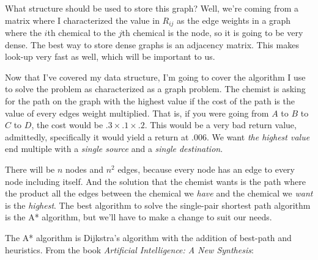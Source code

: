 \documentclass[11pt]{article}
\begin{document}
\begin{enumerate}[label=\textbf{\Alph*.}]
\begin{center}
\end{center}

What structure should be used to store this graph? Well, we're
coming from a matrix where I characterized the value in $R_{ij}$
as the edge weights in a graph where the $i$th chemical to the
$j$th chemical is the node, so it is going to be very dense.
The best way to store dense graphs is an adjacency matrix.
This makes look-up very fast as well, which will be important to
us.

Now that I've covered my data structure, I'm going to cover
the algorithm I use to solve the problem as characterized
as a graph problem.
The chemist is asking for the path on the graph with the highest
value if the cost of the path is the value of every edges weight
multiplied. That is, if you were going from $A$ to $B$ to $C$ to $D$, 
the cost would be $.3 \times .1 \times .2$. This would be a very
bad return value, admittedly, specifically it would yield a return
at $.006$. We want \emph{the highest value} end multiple with a \emph{single
source} and a \emph{single destination}.

There will be $n$ nodes and $n^2$ edges, because every node has an edge
to every node including itself. And the solution that
the chemist wants is the path where the product all the edges between
the chemical we \emph{have} and the chemical we \emph{want} is the
\emph{highest}. The best algorithm to solve the single-pair shortest
path algorithm is the A* algorithm, but we'll have to make a change
to suit our needs.

The A* algorithm is Dijkstra's algorithm with the addition of best-path
and heuristics. 
From the book \emph{Artificial Intelligence: A New Synthesis}:


\end{enumerate}
\end{document}
